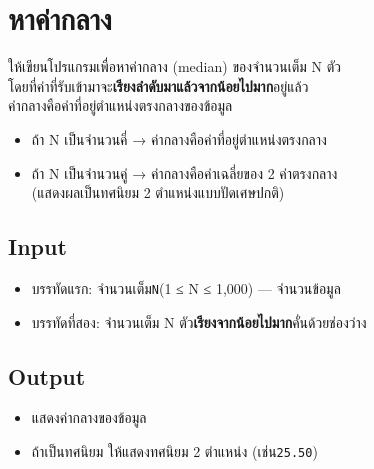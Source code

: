 \documentclass{article}
\begin{document}
\section*{หาค่ากลาง}

ให้เขียนโปรแกรมเพื่อหาค่ากลาง (median) ของจำนวนเต็ม N ตัว\\

โดยที่ค่าที่รับเข้ามาจะ\textbf{เรียงลำดับมาแล้วจากน้อยไปมาก}อยู่แล้ว\\

ค่ากลางคือค่าที่อยู่ตำแหน่งตรงกลางของข้อมูล



\begin{itemize}

\item

  ถ้า N เป็นจำนวนคี่ → ค่ากลางคือค่าที่อยู่ตำแหน่งตรงกลาง

\item

  ถ้า N เป็นจำนวนคู่ → ค่ากลางคือค่าเฉลี่ยของ 2 ค่าตรงกลาง\\

  (แสดงผลเป็นทศนิยม 2 ตำแหน่งแบบปัดเศษปกติ)

\end{itemize}



\subsection*{Input}
\begin{itemize}

\item

  บรรทัดแรก: จำนวนเต็ม\texttt{N}(1 ≤ N ≤ 1,000) --- จำนวนข้อมูล

\item

  บรรทัดที่สอง: จำนวนเต็ม N ตัว\textbf{เรียงจากน้อยไปมาก}คั่นด้วยช่องว่าง

\end{itemize}



\subsection*{Output}
\begin{itemize}

\item

  แสดงค่ากลางของข้อมูล

\item

  ถ้าเป็นทศนิยม ให้แสดงทศนิยม 2 ตำแหน่ง (เช่น\texttt{25.50})

\end{itemize}
\end{document}
